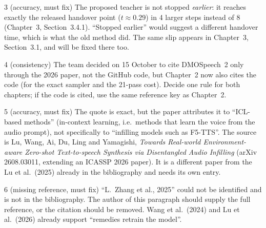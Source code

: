 \documentclass[11pt,a4paper]{article}
\newcounter{cmt}
\begin{document}
\begin{cmt}{3 (accuracy, must fix)}
The proposed teacher is not stopped \emph{earlier}: it reaches exactly the released handover point ($t\approx0.29$) in 4 larger steps instead of 8 (Chapter~3, Section~3.4.1). ``Stopped earlier'' would suggest a different handover time, which is what the old method did. The same slip appears in Chapter~3, Section~3.1, and will be fixed there too.
\end{cmt}
\begin{cmt}{4 (consistency)}
The team decided on 15 October to cite DMOSpeech~2 only through the 2026 paper, not the GitHub code, but Chapter~2 now also cites the code (for the exact sampler and the 21-pass cost). Decide one rule for both chapters; if the code is cited, use the same reference key as Chapter~2.
\end{cmt}
\begin{cmt}{5 (accuracy, must fix)}
The quote is exact, but the paper attributes it to ``ICL-based methods'' (in-context learning, i.e.\ methods that learn the voice from the audio prompt), not specifically to ``infilling models such as F5-TTS''. The source is Lu, Wang, Ai, Du, Ling and Yamagishi, \emph{Towards Real-world Environment-aware Zero-shot Text-to-speech Synthesis via Disentangled Audio Infilling} (arXiv 2608.03011, extending an ICASSP 2026 paper). It is a different paper from the Lu et al.\ (2025) already in the bibliography and needs its own entry.
\end{cmt}
\begin{cmt}{6 (missing reference, must fix)}
``L.\ Zhang et al., 2025'' could not be identified and is not in the bibliography. The author of this paragraph should supply the full reference, or the citation should be removed. Wang et al.\ (2024) and Lu et al.\ (2026) already support ``remedies retrain the model''.
\end{cmt}
\end{document}
